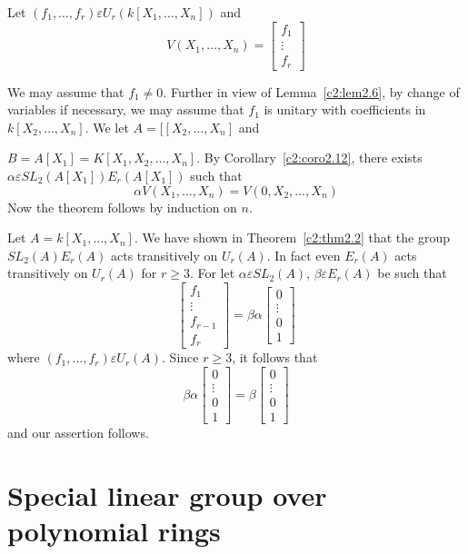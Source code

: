 \begin{PRF}
Let $(f_1,\ldots,f_r) \varepsilon U_r(k[X_1,\ldots,X_n])$ and 
$$
V(X_1,\ldots,X_n)=
\begin{bmatrix}
f_1\\
\vdots\\
f_r
\end{bmatrix}
$$

We may assume that $f_1\neq 0$. Further in view of
Lemma~\ref{c2:lem2.6}, by change of variables if necessary, we may
assume that $f_1$ is unitary with coefficients in
$k[X_2,\ldots,X_n]$. We let $A=[[X_2,\ldots,X_n]$ and 

$B=A[X_1]=K[X_1,X_2,\ldots,X_n]$. By Corollary~\ref{c2:coro2.12},
  there exists $\alpha \varepsilon SL_2(A[X_1])E_r(A[X_1])$ such that 
$$
\alpha V(X_1,\ldots,X_n)=V(0,X_2,\ldots,X_n)
$$
Now the theorem follows by induction on $n$.
\enprf
\end{PRF}


\begin{rem}\label{c2:rem2.13}
Let $A=k[X_1,\ldots,X_n]$. We have shown in Theorem~\ref{c2:thm2.2}
that the group $SL_2(A)E_r(A)$ acts transitively on $U_r(A)$. In fact
even $E_r(A)$ acts transitively on $U_r(A)$ for $r\geq 3$. For let
$\alpha \varepsilon SL_2(A)$, $\beta \varepsilon E_r(A)$ be such that
$$
\begin{bmatrix}
f_1\\
\vdots\\
f_{r-1}\\
f_r
\end{bmatrix} =\beta\alpha \begin{bmatrix}
0\\
\vdots\\
0\\
1
\end{bmatrix}
$$
where $(f_1,\ldots,f_r)\varepsilon U_r(A)$. Since $r\geq 3$, it
follows that 
$$
\beta\alpha
\begin{bmatrix}
0\\
\vdots\\
0\\
1
\end{bmatrix} = \beta \begin{bmatrix}
0\\
\vdots\\
0\\
1
\end{bmatrix}
$$
and our assertion follows.
\end{rem}

\section{Special linear group over polynomial rings}\label{c2:s3}

